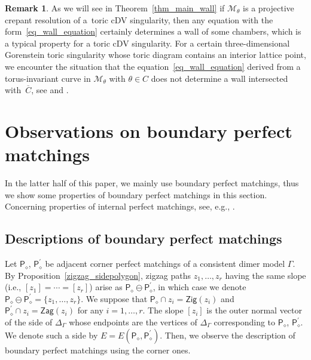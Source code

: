 \documentclass[10pt,a4paper]{amsart}
\numberwithin{equation}{section}
\theoremstyle{definition}
\newtheorem{Remark}[Theorem]{Remark}
\newcommand{\calM}{\mathcal{M}}
\newcommand{\sfP}{\mathsf{P}}
\newcommand{\Zig}{\mathsf{Zig}}
\newcommand{\Zag}{\mathsf{Zag}}
\newcommand{\cPM}{\sfP_\diamond}
\begin{document}
\begin{Remark}
As we will see in Theorem~\ref{thm_main_wall} if $\calM_\theta$ is a projective crepant resolution of a~toric cDV singularity,
then any equation with the form~\eqref{eq_wall_equation} certainly
determines a wall of some chambers, which is a typical property for a toric cDV singularity.
For a certain three-dimensional Gorenstein toric singularity whose toric diagram contains an interior lattice point,
we encounter the situation that the equation~\eqref{eq_wall_equation} derived from a torus-invariant curve in $\calM_\theta$ with $\theta\in C$
does not determine a wall intersected with~$\overline{C}$, see \cite[Example~9.13]{CrawIshii} and \cite[Example~12.6]{IU_anycrepant}.
\end{Remark}

\section{Observations on boundary perfect matchings}\label{section_boundaryPM}

In the latter half of this paper, we mainly use boundary perfect matchings, thus we show some properties of boundary perfect matchings in this section.
Concerning properties of internal perfect matchings, see, e.g., \cite[Sections~3 and 5]{Nak_2rep}.

\subsection{Descriptions of boundary perfect matchings}\label{subsec_boundaryPM}

Let $\cPM$, $\cPM^\prime$ be adjacent corner perfect matchings of a consistent dimer model $\Gamma$.
By Proposition~\ref{zigzag_sidepolygon}, zigzag paths $z_1,\dots, z_r$ having the same slope (i.e., $[z_1]=\cdots=[z_r]$)
arise as $\cPM\ominus\cPM^\prime$, in which case we denote $\cPM\ominus\cPM^\prime=\{z_1,\dots, z_r\}$.
We suppose that $\cPM\cap z_i=\Zig(z_i)$ and $\cPM^\prime\cap z_i=\Zag(z_i)$ for any $i=1,\dots,r$.
The slope $[z_i]$ is the outer normal vector of the side of $\Delta_\Gamma$ whose endpoints are the vertices of $\Delta_\Gamma$
corresponding to $\cPM$, $\cPM^\prime$. We denote such a side by $E=E(\cPM, \cPM^\prime)$.
Then, we observe the description of boundary perfect matchings using the corner ones.
\end{document}
